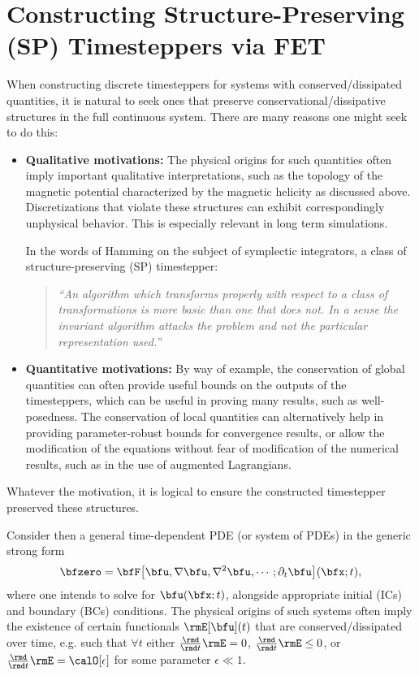 \section{Constructing Structure-Preserving (SP) Timesteppers via FET}
    When constructing discrete timesteppers for systems with conserved/dissipated quantities, it is natural to seek ones that preserve conservational/dissipative structures in the full continuous system. There are many reasons one might seek to do this:
    \begin{itemize}
        \item  {\bf Qualitative motivations:} The physical origins for such quantities often imply important qualitative interpretations, such as the topology of the magnetic potential characterized by the magnetic helicity as discussed above. Discretizations that violate these structures can exhibit correspondingly unphysical behavior. This is especially relevant in long term simulations. 
        
        In the words of Hamming on the subject of symplectic integrators, a class of structure-preserving (SP) timestepper: \cite{Hamming_1986}
        \begin{quotation}
            \emph{``An algorithm which transforms properly with respect to a class of transformations is more basic than one that does not. In a sense the invariant algorithm attacks the problem and not the particular representation used.''}
        \end{quotation}
        

        \item  {\bf Quantitative motivations:} By way of example, the conservation of global quantities can often provide useful bounds on the outputs of the timesteppers, which can be useful in proving many results, such as well-posedness. The conservation of local quantities can alternatively help in providing parameter-robust bounds for convergence results, or allow the modification of the equations without fear of modification of the numerical results, such as in the use of augmented Lagrangians. \cite{FMW19, Laakmann_Farrell_Mitchell_22}
    \end{itemize}
    Whatever the motivation, it is logical to ensure the constructed timestepper preserved these structures.

    Consider then a general time-dependent PDE (or system of PDEs) in the generic strong form
    \begin{equation}\label{eqn:general time-dependent PDE}
        \bfzero  =  \bfF\!\left[\bfu, \nabla\bfu, \nabla^{2}\bfu, \cdots; \partial_{t}\bfu\right]\!(\bfx; t),
    \end{equation}
    where one intends to solve for $\bfu(\bfx; t)$, alongside appropriate initial (ICs) and boundary (BCs) conditions. The physical origins of such systems often imply the existence of certain functionals $\rmE[\bfu](t)$ that are conserved/dissipated over time, e.g. such that $\forall  t$ either $\frac{\rmd}{\rmd t}\rmE  =  0$, $\frac{\rmd}{\rmd t}\rmE  \leq  0$, or $\frac{\rmd}{\rmd t}\rmE  =  \calO[\epsilon]$ for some parameter $\epsilon \ll 1$.
    
